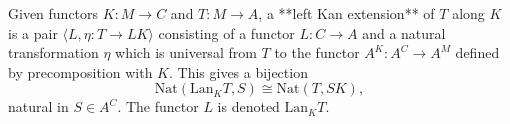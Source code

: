 Given functors $K: M \to C$ and $T: M \to A$, a **left Kan extension** of $T$ along $K$ is a pair $\langle L, \eta: T \to LK \rangle$ consisting of a functor $L: C \to A$ and a natural transformation $\eta$ which is universal from $T$ to the functor $A^K: A^C \to A^M$ defined by precomposition with $K$. This gives a bijection
$$\mathrm{Nat}(\mathrm{Lan}_K T, S) \cong \mathrm{Nat}(T, SK),$$
natural in $S \in A^C$. The functor $L$ is denoted $\mathrm{Lan}_K T$.
